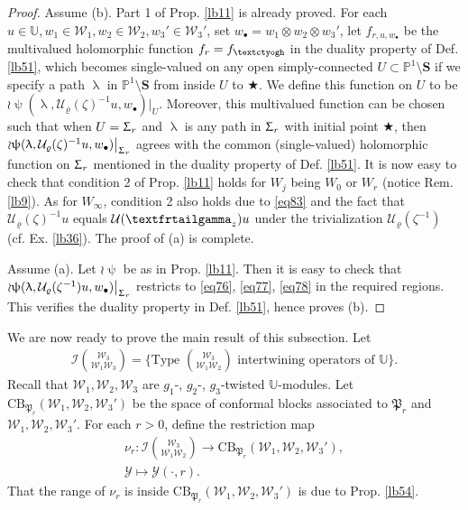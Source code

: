 \documentclass[11pt,b5paper,notitlepage]{article}
\theoremstyle{definition}
\theoremstyle{plain}
\newcommand{\fk}{\mathfrak}
\newcommand{\mc}{\mathcal}
\newcommand{\blt}{\bullet}
\newcommand{\Ubb}{\mathbb U}
\newcommand{\Pbb}{\mathbb P}
\newcommand{\Sbf}{\mathbf{S}}
\newcommand{\CB}{\mathrm{CB}}
\newcommand{\tipaz}{\text{\textctyogh}}
\newcommand{\tipxgamma}{\text{\textfrtailgamma}}
\numberwithin{equation}{subsection}
\begin{document}
\begin{proof}
Assume (b). Part 1 of Prop. \ref{lb11} is already proved. For each $u\in\Ubb,w_1\in\mc W_1,w_2\in\mc W_2,w_3'\in\mc W_3'$, set $w_\blt=w_1\otimes w_2\otimes w_3'$, let $f_{r,u,w_\blt}$ be the multivalued holomorphic function $f_r=f_\tipaz$ in the duality property of Def. \ref{lb51}, which becomes single-valued on any open simply-connected  $U\subset\Pbb^1\setminus\Sbf$ if we specify a path $\uplambda$ in $\Pbb^1\setminus\Sbf$ from inside $U$ to $\bigstar$.  We define this function on $U$ to be $\wr\uppsi(\uplambda,\mc U_\varrho(\zeta)^{-1}u,w_\blt)\big|_U$. Moreover, this multivalued function can be chosen such that when $U=\Upsigma_r$ and $\uplambda$ is any path in $\Upsigma_r$ with initial point $\bigstar$, then $\wr\uppsi(\uplambda,\mc U_\varrho(\zeta)^{-1}u,w_\blt)\big|_{\Upsigma_r}$ agrees with the common (single-valued) holomorphic function on $\Upsigma_r$ mentioned in the duality property of Def. \ref{lb51}. It is now easy to check that condition 2 of Prop. \ref{lb11} holds for $W_j$ being $W_0$ or $W_r$ (notice Rem. \ref{lb9}). As for $W_\infty$, condition 2 also holds due to \eqref{eq83} and the fact that $\mc U_\varrho(\zeta)^{-1}u$ equals $\mc U(\tipxgamma_z)u$ under the trivialization $\mc U_\varrho(\zeta^{-1})$  (cf. Ex. \ref{lb36}). The proof of (a) is complete.

Assume (a). Let $\wr\uppsi$ be as in Prop. \ref{lb11}. Then it is easy to check that $\wr\uppsi(\uplambda,\mc U_\varrho(\zeta^{-1})u,w_\blt)\big|_{\Upsigma_r}$ restricts to \eqref{eq76}, \eqref{eq77}, \eqref{eq78} in the required regions. This verifies the duality property in Def. \ref{lb51}, hence proves (b).
\end{proof}






We are now ready to prove the main result of this subsection. Let
\begin{align*}
\mc I{\mc W_3\choose \mc W_1\mc W_3}=\bigg\{\text{Type }{\mc W_3\choose \mc W_1\mc W_2}\text{ intertwining operators of }\Ubb\bigg\}.	
\end{align*}
Recall that $\mc W_1,\mc W_2,\mc W_3$ are  $g_1$-, $g_2$-, $g_3$-twisted $\Ubb$-modules. Let $\CB_{\fk P_r}(\mc W_1,\mc W_2,\mc W_3')$ be the space of conformal blocks associated to $\fk P_r$ and $\mc W_1,\mc W_2,\mc W_3'$. For each $r>0$, define the restriction map
\begin{gather*}
\nu_r:	\mc I{\mc W_3\choose \mc W_1\mc W_2}\rightarrow \CB_{\fk P_r}(\mc W_1,\mc W_2,\mc W_3'),\\
\mc Y\mapsto \mc Y(\cdot,r).
\end{gather*}
That the range of $\nu_r$ is inside $ \CB_{\fk P_r}(\mc W_1,\mc W_2,\mc W_3')$ is due to Prop. \ref{lb54}.
\end{document}
